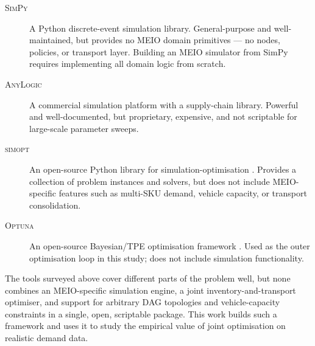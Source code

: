 \begin{description}
  \item[\textsc{SimPy}] A Python discrete-event simulation library.
        General-purpose and well-maintained, but provides no MEIO domain
        primitives — no nodes, policies, or transport layer.  Building an
        MEIO simulator from SimPy requires implementing all domain logic
        from scratch.

  \item[\textsc{AnyLogic}] A commercial simulation platform with a
        supply-chain library.  Powerful and well-documented, but
        proprietary, expensive, and not scriptable for large-scale
        parameter sweeps.

  \item[\textsc{simopt}] An open-source Python library for
        simulation-optimisation \citep{SimOptLib2022}.  Provides a
        collection of problem instances and solvers, but does not
        include MEIO-specific features such as multi-SKU demand,
        vehicle capacity, or transport consolidation.

  \item[\textsc{Optuna}] An open-source Bayesian/TPE optimisation
        framework \citep{AkibaEtAl2019}.  Used as the outer
        optimisation loop in this study; does not include simulation
        functionality.
\end{description}
The tools surveyed above cover different parts of the problem well, but none combines
an MEIO-specific simulation engine, a joint inventory-and-transport optimiser, and
support for arbitrary DAG topologies and vehicle-capacity constraints in a single,
open, scriptable package.  This work builds such a framework and uses it to study
the empirical value of joint optimisation on realistic demand data.
